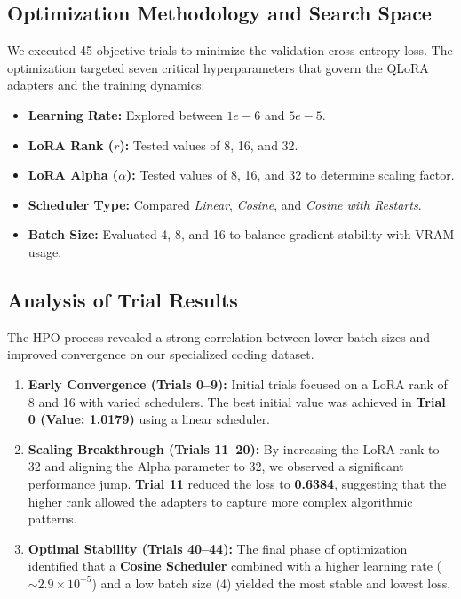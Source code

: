 \subsection{Optimization Methodology and Search Space}
We executed 45 objective trials to minimize the validation cross-entropy loss. The optimization targeted seven critical hyperparameters that govern the QLoRA adapters and the training dynamics:
\begin{itemize}
    \item \textbf{Learning Rate:} Explored between $1e-6$ and $5e-5$.
    \item \textbf{LoRA Rank ($r$):} Tested values of 8, 16, and 32.
    \item \textbf{LoRA Alpha ($\alpha$):} Tested values of 8, 16, and 32 to determine scaling factor.
    \item \textbf{Scheduler Type:} Compared \textit{Linear}, \textit{Cosine}, and \textit{Cosine with Restarts}.
    \item \textbf{Batch Size:} Evaluated 4, 8, and 16 to balance gradient stability with VRAM usage.
\end{itemize}



\subsection{Analysis of Trial Results}
The HPO process revealed a strong correlation between lower batch sizes and improved convergence on our specialized coding dataset. 

\begin{enumerate}
    \item \textbf{Early Convergence (Trials 0--9):} Initial trials focused on a LoRA rank of 8 and 16 with varied schedulers. The best initial value was achieved in \textbf{Trial 0 (Value: 1.0179)} using a linear scheduler.
    \item \textbf{Scaling Breakthrough (Trials 11--20):} By increasing the LoRA rank to 32 and aligning the Alpha parameter to 32, we observed a significant performance jump. \textbf{Trial 11} reduced the loss to \textbf{0.6384}, suggesting that the higher rank allowed the adapters to capture more complex algorithmic patterns.
    \item \textbf{Optimal Stability (Trials 40--44):} The final phase of optimization identified that a \textbf{Cosine Scheduler} combined with a higher learning rate ($\sim 2.9 \times 10^{-5}$) and a low batch size (4) yielded the most stable and lowest loss. 
\end{enumerate}



